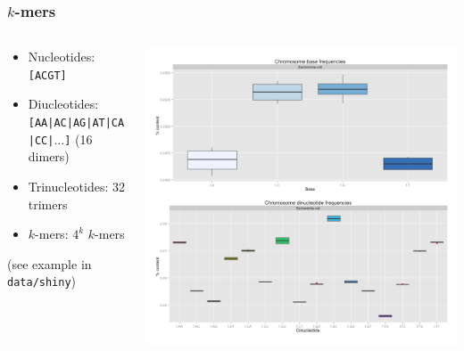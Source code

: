 \begin{frame}
  \frametitle{$k$-mers}
  \begin{columns}[T]
    \begin{column}{5cm}
      \begin{itemize}
        \item Nucleotides: \texttt{[ACGT]}
        \item Diucleotides: \texttt{[AA|AC|AG|AT|CA|CC|$\ldots$]} (16 dimers)
        \item Trinucleotides: 32 trimers
        \item $k$-mers: $4^k$ $k$-mers
      \end{itemize}
      (see example in \texttt{data/shiny})
    \end{column}
    \begin{column}{5cm}
     \includegraphics[height=0.5\textheight]{images/kmer_ecoli}\\

\end{column}
\end{columns}
\end{frame}
